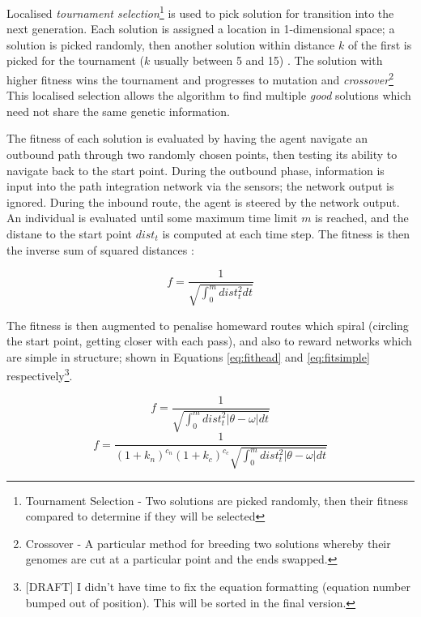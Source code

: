 \documentclass[a4paper,11pt,twoside,openright]{article}
\begin{document}
Localised \textit{tournament selection}\footnote{Tournament Selection - Two
  solutions are picked randomly, then their fitness compared to determine if they
  will be selected} is used to pick solution for transition into the next
generation. Each solution is assigned a location in 1-dimensional space; a
solution is picked randomly, then another solution within distance $k$ of the
first is picked for the tournament ($k$ usually between 5 and 15)
\cite{Haferlach2007}. The solution with higher fitness wins the tournament
and progresses to mutation and \textit{crossover}\footnote{Crossover - A
  particular method for breeding two solutions whereby their genomes are cut at
  a particular point and the ends swapped.} This localised selection allows
the algorithm to find multiple \textit{good} solutions which need not share the
same genetic information.
\newline
\par

The fitness of each solution is evaluated by having the agent navigate an
outbound path through two randomly chosen points, then testing its ability
to navigate back to the start point. During the outbound phase, information is
input into the path integration network via the sensors; the network output is
ignored. During the inbound route, the agent is steered by the network output.
An individual is evaluated until some maximum time limit $m$ is reached, and the
distane to the start point $dist_t$ is computed at each time step. The fitness is
then the inverse sum of squared distances \cite{Haferlach2007}:

\begin{equation}
 f = \frac{1}{\sqrt{\int_{0}^m dist_t^2 dt}}
\end{equation}

The fitness is then augmented to penalise homeward routes which
spiral (circling the start point, getting closer with each pass), and
also to reward networks which are simple in structure; shown in
Equations \ref{eq:fithead} and \ref{eq:fitsimple} respectively\footnote{
  [DRAFT] I didn't have time to fix the equation formatting
  (equation number bumped out of position). This will be sorted
  in the final version.
  }.

\begin{multicols}{2}
  \begin{equation}
    \label{eq:fithead}
   f = \frac{1}{\sqrt{\int_{0}^m dist_t^2 |\theta - \omega | dt}}
  \end{equation}\break
  \begin{equation}
    \label{eq:fitsimple}
    f = \frac{1}{(1 + k_n)^{c_n}(1 + k_c)^{c_c}
      \sqrt{\int_{0}^m dist_t^2 |\theta - \omega | dt}}
  \end{equation}
\end{multicols}
\end{document}
